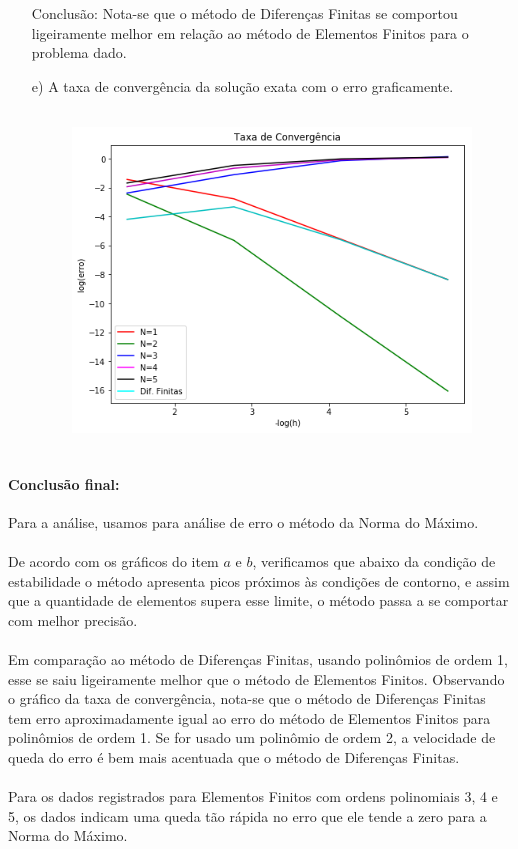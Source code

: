 \documentclass{article}
\begin{document}
\begin{itemize}
Conclusão: Nota-se que o método de Diferenças Finitas se comportou ligeiramente melhor em relação ao método de Elementos Finitos para o problema dado.

\newpage
\item[e)] A taxa de convergência da solução exata com o erro graficamente.

\begin{figure}[!htb]
\centering
\includegraphics [width=12cm,height=9cm]{LetraE/taxa_convergencia.png}
\end{figure}

\end{itemize}

\paragraph{Conclusão final:}
\indent
Para a análise, usamos para análise de erro o método da Norma do Máximo.\\\\
De acordo com os gráficos do item $a$ e $b$, verificamos que abaixo da condição de estabilidade o método apresenta picos próximos às condições de contorno, e assim que a quantidade de elementos supera esse limite, o método passa a se comportar com melhor precisão.\\\\
Em comparação ao método de Diferenças Finitas, usando polinômios de ordem 1, esse se saiu ligeiramente melhor que o método de Elementos Finitos. Observando o gráfico da taxa de convergência, nota-se que o método de Diferenças Finitas tem erro aproximadamente igual ao erro do método de Elementos Finitos para polinômios de ordem 1. Se for usado um polinômio de ordem 2, a velocidade de queda do erro é bem mais acentuada que o método de Diferenças Finitas.\\\\
Para os dados registrados para Elementos Finitos com ordens polinomiais 3, 4 e 5, os dados indicam uma queda tão rápida no erro que ele tende a zero para a Norma do Máximo.
\noindent
\end{document}
